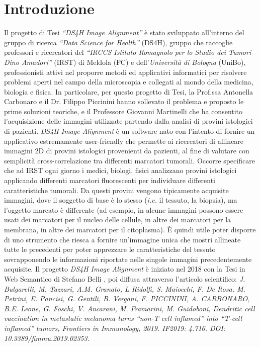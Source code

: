 \chapter*{Introduzione}
    \noindent Il progetto di Tesi \textit{``DS4H Image Alignment''} è stato sviluppato all'interno del gruppo di ricerca \textit{``Data Science for Health''} (DS4H), gruppo che raccoglie professori e ricercatori del \textit{``IRCCS Istituto Romagnolo per lo Studio dei Tumori Dino Amadori''} (IRST) di Meldola (FC) e dell'\textit{Università di Bologna} (UniBo), professionisti attivi nel proporre metodi ed applicativi informatici per risolvere problemi aperti nel campo della microscopia e collegati al mondo della medicina, biologia e fisica. In particolare, per questo progetto di Tesi, la Prof.ssa Antonella Carbonaro e il Dr. Filippo Piccinini hanno sollevato il problema e proposto le prime soluzioni teoriche, e il Professore Giovanni Martinelli che ha consentito l’acquisizione delle immagini utilizzate partendo dalla analisi di provini istologici di pazienti.\hfill \break
    \noindent \textit{DS4H Image Alignment} è un software nato con l’intento di fornire un applicativo estremamente user-friendly che permette ai ricercatori di allineare immagini 2D di provini istologici provenienti da pazienti, al fine di valutare con semplicità cross-correlazione tra differenti marcatori tumorali. Occorre specificare che ad IRST ogni giorno i medici, biologi, fisici analizzano provini istologici applicando differenti marcatori fluorescenti per individuare differenti caratteristiche tumorali. Da questi provini vengono tipicamente acquisite immagini, dove il soggetto di base è lo stesso (\textit{i.e.} il tessuto, la biopsia), ma l’oggetto marcato è differente (ad esempio, in alcune immagini possono essere usati dei marcatori per il nucleo delle cellule, in altre dei marcatori per la membrana, in altre dei marcatori per il citoplasma). È quindi utile poter disporre di uno strumento che riesca a fornire un'immagine unica che mostri allineate tutte le precedenti per poter apprezzare le caratteristiche del tessuto sovrapponendo le informazioni riportate nelle singole immagini precedentemente acquisite.\hfill \break
    \noindent Il progetto \textit{DS4H Image Alignment} è iniziato nel 2018 con la Tesi in Web Semantico di Stefano Belli \cite{amslaurea19123}, poi diffusa attraverso l’articolo scientifico: \textit{J. Bulgarelli, M. Tazzari, A.M. Granato, L Ridolfi, S. Maiocchi, F. De Rosa, M. Petrini, E. Pancisi, G. Gentili, B. Vergani, F. PICCININI, A. CARBONARO, B.E. Leone, G. Foschi, V. Ancarani, M. Framarini, M. Guidoboni, Dendritic cell vaccination in metastatic melanoma turns “non-T cell inflamed” into “T-cell inflamed” tumors, Frontiers in Immunology, 2019. IF2019: 4.716. DOI: 10.3389/fimmu.2019.02353}. \cite{Bulgarelli2019-oa} \hfill \break
